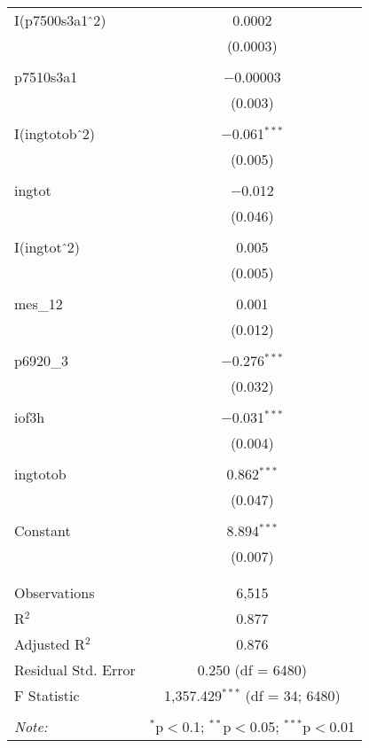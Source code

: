 \begin{table}[!htbp]
\begin{tabular}{@{\extracolsep{5pt}}lc}
 I(p7500s3a1$\hat{\mkern6mu}$2) & 0.0002 \\ 
  & (0.0003) \\ 
  & \\ 
 p7510s3a1 & $-$0.00003 \\ 
  & (0.003) \\ 
  & \\ 
 I(ingtotob$\hat{\mkern6mu}$2) & $-$0.061$^{***}$ \\ 
  & (0.005) \\ 
  & \\ 
 ingtot & $-$0.012 \\ 
  & (0.046) \\ 
  & \\ 
 I(ingtot$\hat{\mkern6mu}$2) & 0.005 \\ 
  & (0.005) \\ 
  & \\ 
 mes\_12 & 0.001 \\ 
  & (0.012) \\ 
  & \\ 
 p6920\_3 & $-$0.276$^{***}$ \\ 
  & (0.032) \\ 
  & \\ 
 iof3h & $-$0.031$^{***}$ \\ 
  & (0.004) \\ 
  & \\ 
 ingtotob & 0.862$^{***}$ \\ 
  & (0.047) \\ 
  & \\ 
 Constant & 8.894$^{***}$ \\ 
  & (0.007) \\ 
  & \\ 
\hline \\[-1.8ex] 
Observations & 6,515 \\ 
R$^{2}$ & 0.877 \\ 
Adjusted R$^{2}$ & 0.876 \\ 
Residual Std. Error & 0.250 (df = 6480) \\ 
F Statistic & 1,357.429$^{***}$ (df = 34; 6480) \\ 
\hline 
\hline \\[-1.8ex] 
\textit{Note:}  & \multicolumn{1}{r}{$^{*}$p$<$0.1; $^{**}$p$<$0.05; $^{***}$p$<$0.01} \\ 
\end{tabular} 
\end{table} 
